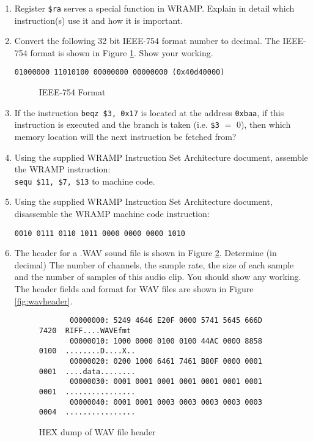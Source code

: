 \documentclass[a4paper,10pt]{article}
\begin{document}
\begin{enumerate}
\item Register \texttt{\$ra} serves a special function in WRAMP. Explain in detail which instruction(s)
use it and how it is important.

\item Convert the following 32 bit IEEE-754 format number to decimal.
The IEEE-754 format is shown in Figure \ref{fig:ieee754}. Show your working.
\begin{center}
\texttt{01000000 11010100 00000000 00000000 (0x40d40000)}
\end{center}

\begin{figure}[h]
\begin{center}
    \caption{IEEE-754 Format}
    \label{fig:ieee754}
  \end{center}
\end{figure}

\item If the instruction \texttt{beqz \$3, 0x17} is located at the
address \texttt{0xbaa}, if this instruction is executed and the branch is taken
(i.e. \texttt{\$3} $=$ 0), then which memory location will the next
instruction be fetched from?

\item Using the supplied WRAMP Instruction Set Architecture document,
assemble the WRAMP instruction:\\
\texttt{sequ \$11, \$7, \$13} to machine code.

 \newpage
\item Using the supplied WRAMP Instruction Set Architecture document,
disassemble the WRAMP machine code instruction:
\begin{center}
\texttt{0010 0111 0110 1011 0000 0000 0000 1010}
\end{center}

\item The header for a .WAV sound file is shown in Figure
\ref{fig:wavhex}. Determine (in decimal) The number of channels, the sample rate, the size of each
sample and the number of samples of this audio clip. You should show any working. The header fields
and format for WAV files are
shown in Figure \ref{fig:wavheader}. 

\begin{figure}[h]
  \begin{center}
{\small
\begin{verbatim}
       00000000: 5249 4646 E20F 0000 5741 5645 666D 7420  RIFF....WAVEfmt
       00000010: 1000 0000 0100 0100 44AC 0000 8858 0100  ........D....X..
       00000020: 0200 1000 6461 7461 B80F 0000 0001 0001  ....data........
       00000030: 0001 0001 0001 0001 0001 0001 0001 0001  ................
       00000040: 0001 0001 0003 0003 0003 0003 0003 0004  ................
\end{verbatim}}
\caption{HEX dump of WAV file header}
  \end{center}
\label{fig:wavhex}
\end{figure}


\end{enumerate}
\end{document}
